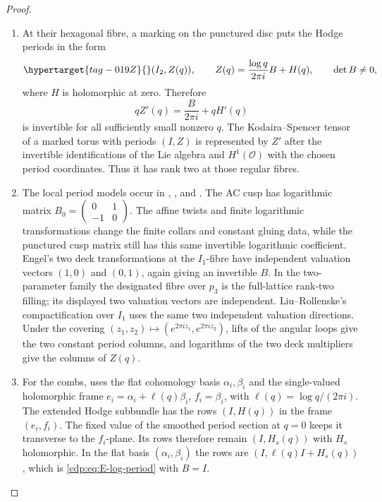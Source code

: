 \begin{proof}

\begin{enumerate}[label=\arabic*.,leftmargin=*]
\item At their hexagonal fibre, a marking on the punctured disc puts
the Hodge periods in the form
\begin{equation}\hypertarget{tag-019Z}{}\label{cdp:eq:E-log-period}
  (I_2,Z(q)),\qquad
 Z(q)=\frac{\log q}{2\pi i}B+H(q),
 \qquad \det B\ne0,
\end{equation}
where $H$ is holomorphic at zero. Therefore
\[
 qZ'(q)=\frac{B}{2\pi i}+qH'(q)
\]
is invertible for all sufficiently small nonzero $q$. The
Kodaira--Spencer tensor of a marked torus with periods $(I,Z)$
is represented by $Z'$ after the invertible identifications of
the Lie algebra and $H^1(\mathcal O)$ with the chosen period
coordinates. Thus it has rank two at those regular fibres.

\item The local period models occur in
\cite[Proposition~6.1]{Viaclovsky2026Combs},
\cite[Proposition~3.1]{Viaclovsky2026Two}, and
\cite[Proposition~2.5]{LiuRollenske2026}.
The AC cusp has logarithmic matrix
$B_0=\left(\begin{smallmatrix}0&1\\-1&0\end{smallmatrix}\right)$.
The affine twists and finite logarithmic transformations change
the finite collars and constant gluing data, while the punctured
cusp matrix still has this same invertible logarithmic coefficient.
Engel's two deck transformations at the $I_1$-fibre have independent
valuation vectors $(1,0)$ and $(0,1)$, again giving an invertible
$B$. In the two-parameter family the designated fibre over $p_3$
is the full-lattice rank-two filling; its displayed two valuation
vectors are independent. Liu--Rollenske's compactification over
$I_1$ uses the same two independent valuation directions. Under the covering
$(z_1,z_2)\mapsto(e^{2\pi iz_1},e^{2\pi iz_2})$, lifts of the
angular loops give the two constant period columns, and logarithms
of the two deck multipliers give the columns of $Z(q)$.

\item For the combs, \cite[Proposition~4.1, case~(i)]{Viaclovsky2026Combs}
uses the flat cohomology basis $\alpha_i,\beta_i$ and the
single-valued holomorphic frame
$e_i=\alpha_i+\ell(q)\beta_i$, $f_i=\beta_i$, with
$\ell(q)=\log q/(2\pi i)$. The extended Hodge subbundle has
the rows $(I,H(q))$ in the frame $(e_i,f_i)$. The fixed value of the
smoothed period section at $q=0$ keeps it transverse to the
$f_i$-plane. Its rows therefore remain $(I,H_s(q))$ with
$H_s$ holomorphic. In the flat basis $(\alpha_i,\beta_i)$ the rows are
$(I,\ell(q)I+H_s(q))$, which is \eqref{cdp:eq:E-log-period} with
$B=I$.


\end{enumerate}
\end{proof}
